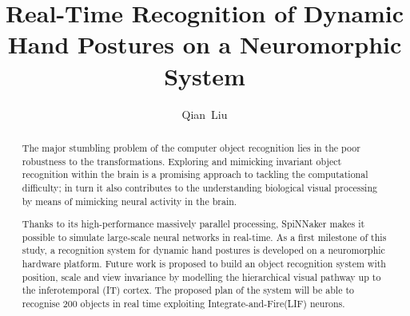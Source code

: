 \documentclass[journal]{journal}
\begin{document}
\title{Real-Time Recognition of Dynamic Hand Postures on a Neuromorphic System}
\author{
Qian~Liu
}%

\maketitle
\thispagestyle{empty}

\begin{abstract}
The major stumbling problem of the computer object recognition lies in the poor robustness to the transformations.
Exploring and mimicking invariant object recognition within the brain is a promising approach to tackling the computational difficulty;
in turn it also contributes to the understanding biological visual processing by means of mimicking neural activity in the brain.

Thanks to its high-performance massively parallel processing, SpiNNaker makes it possible to simulate large-scale neural networks in real-time.
As a first milestone of this study, a recognition system for dynamic hand postures is developed on a neuromorphic hardware platform. Future work is proposed to build an object recognition system with position, scale and view invariance by modelling the hierarchical visual pathway up to the inferotemporal (IT) cortex.
The proposed plan of the system will be able to recognise 200 objects in real time exploiting Integrate-and-Fire(LIF) neurons.
\end{abstract}

\end{document}
